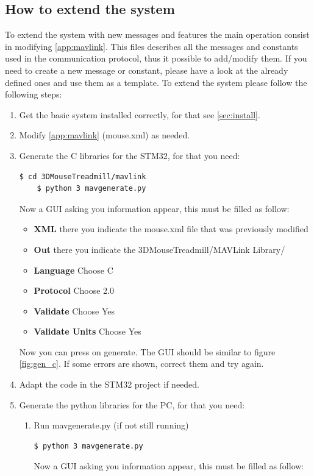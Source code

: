 \documentclass[12pt,a4paper, twoside]{article}
\begin{document}
\subsection{How to extend the system}
To extend the system with new messages and features the main operation consist in modifying \ref{app:mavlink}. This files describes all the messages and constants used in the communication protocol, thus it possible to add/modify them. If you need to create a new message or constant, please have a look at the already defined ones and use them as a template. 
To extend the system please follow the following steps:
\begin{enumerate}
	\item Get the basic system installed correctly, for that see \ref{sec:install}.
	\item Modify \ref{app:mavlink} (mouse.xml) as needed.
	\item Generate the C libraries for the STM32, for that you need:
	\begin{lstlisting}[style = Bashstyle]
	$ cd 3DMouseTreadmill/mavlink
	$ python 3 mavgenerate.py
	\end{lstlisting}
	Now a GUI asking you information appear, this must be filled as follow:
	\begin{itemize}
		\item \textbf{XML} there you indicate the mouse.xml file that was previously modified
		\item \textbf{Out} there you indicate the 3DMouseTreadmill/MAVLink Library/
		\item \textbf{Language} Choose C
		\item \textbf{Protocol} Choose 2.0
		\item \textbf{Validate} Choose Yes
		\item \textbf{Validate Units} Choose Yes
	\end{itemize}
	Now you can press on generate.
	The GUI should be similar to figure \ref{fig:gen_c}.
	If some errors are shown, correct them and try again.
	\item Adapt the code in the STM32 project if needed.
	\item Generate the python libraries for the PC, for that you need:
	\begin{enumerate}
		\item Run mavgenerate.py (if not still running)
		\begin{lstlisting}[style = Bashstyle]
		$ python 3 mavgenerate.py
		\end{lstlisting}
		Now a GUI asking you information appear, this must be filled as follow:

\end{enumerate}
\end{enumerate}
\end{document}
